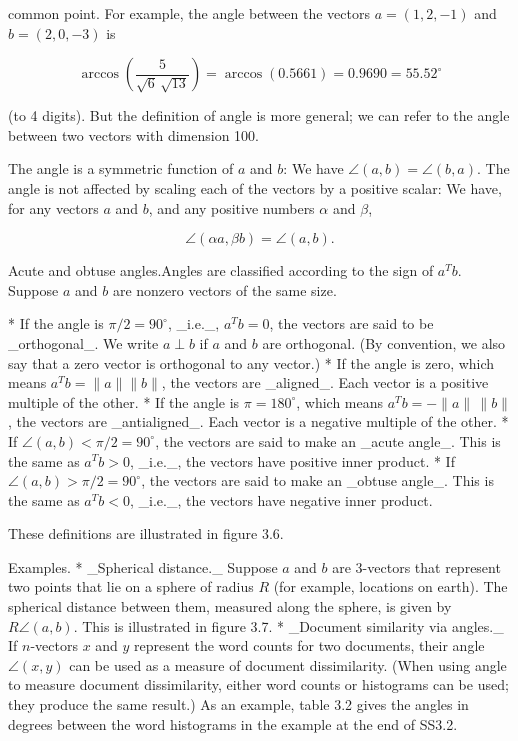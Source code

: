 common point. For example, the angle between the vectors \(a=(1,2,-1)\) and \(b=(2,0,-3)\) is

\[\arccos\left(\frac{5}{\sqrt{6}\,\sqrt{13}}\right)=\arccos(0.5661)=0.9690=55.52^{\circ}\]

(to 4 digits). But the definition of angle is more general; we can refer to the angle between two vectors with dimension 100.

The angle is a symmetric function of \(a\) and \(b\): We have \(\angle(a,b)=\angle(b,a)\). The angle is not affected by scaling each of the vectors by a positive scalar: We have, for any vectors \(a\) and \(b\), and any positive numbers \(\alpha\) and \(\beta\),

\[\angle(\alpha a,\beta b)=\angle(a,b).\]

Acute and obtuse angles.Angles are classified according to the sign of \(a^{T}b\). Suppose \(a\) and \(b\) are nonzero vectors of the same size.

* If the angle is \(\pi/2=90^{\circ}\), _i.e._, \(a^{T}b=0\), the vectors are said to be _orthogonal_. We write \(a\perp b\) if \(a\) and \(b\) are orthogonal. (By convention, we also say that a zero vector is orthogonal to any vector.)
* If the angle is zero, which means \(a^{T}b=\|a\|\|b\|\), the vectors are _aligned_. Each vector is a positive multiple of the other.
* If the angle is \(\pi=180^{\circ}\), which means \(a^{T}b=-\|a\|\,\|b\|\), the vectors are _antialigned_. Each vector is a negative multiple of the other.
* If \(\angle(a,b)<\pi/2=90^{\circ}\), the vectors are said to make an _acute angle_. This is the same as \(a^{T}b>0\), _i.e._, the vectors have positive inner product.
* If \(\angle(a,b)>\pi/2=90^{\circ}\), the vectors are said to make an _obtuse angle_. This is the same as \(a^{T}b<0\), _i.e._, the vectors have negative inner product.

These definitions are illustrated in figure 3.6.

Examples.
* _Spherical distance._ Suppose \(a\) and \(b\) are 3-vectors that represent two points that lie on a sphere of radius \(R\) (for example, locations on earth). The spherical distance between them, measured along the sphere, is given by \(R\angle(a,b)\). This is illustrated in figure 3.7.
* _Document similarity via angles._ If \(n\)-vectors \(x\) and \(y\) represent the word counts for two documents, their angle \(\angle(x,y)\) can be used as a measure of document dissimilarity. (When using angle to measure document dissimilarity, either word counts or histograms can be used; they produce the same result.) As an example, table 3.2 gives the angles in degrees between the word histograms in the example at the end of SS3.2.

 
